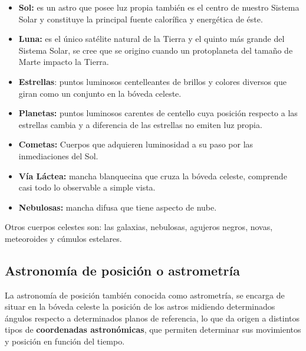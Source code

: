 \documentclass[10pt,a4paper]{article}
\begin{document}
\begin{itemize}
\item \textbf{Sol:} es un astro que posee luz propia también es el centro de nuestro Sistema Solar y constituye la principal fuente calorífica y energética de éste.
\item \textbf{Luna:} es el único satélite natural de la Tierra y el quinto más grande del Sistema Solar, se cree que se origino cuando un protoplaneta del tamaño de Marte impacto la Tierra.
\item \textbf{Estrellas}: puntos luminosos centelleantes de brillos y colores diversos que giran como un conjunto en la bóveda celeste.
\item \textbf{Planetas:} puntos luminosos carentes de centello cuya posición respecto a las estrellas cambia y a diferencia de las estrellas no emiten luz propia. 
\item \textbf{Cometas:} Cuerpos que adquieren luminosidad a su paso por las inmediaciones del Sol. 
\item \textbf{Vía Láctea:} mancha blanquecina que cruza la bóveda celeste, comprende casi todo lo observable a simple vista.
\item \textbf{Nebulosas:} mancha difusa que tiene aspecto de nube. 
\end{itemize}

Otros cuerpos celestes son: las galaxias, nebulosas, agujeros negros, novas, meteoroides y cúmulos estelares.

\subsection{Astronomía de posición o astrometría}
La astronomía de posición también conocida como astrometría, se encarga de situar en la bóveda celeste la posición de los astros midiendo determinados ángulos respecto a determinados planos de referencia, lo que da origen a distintos tipos de \textbf{coordenadas astronómicas}, que permiten determinar sus movimientos y posición en función del tiempo.
\end{document}
